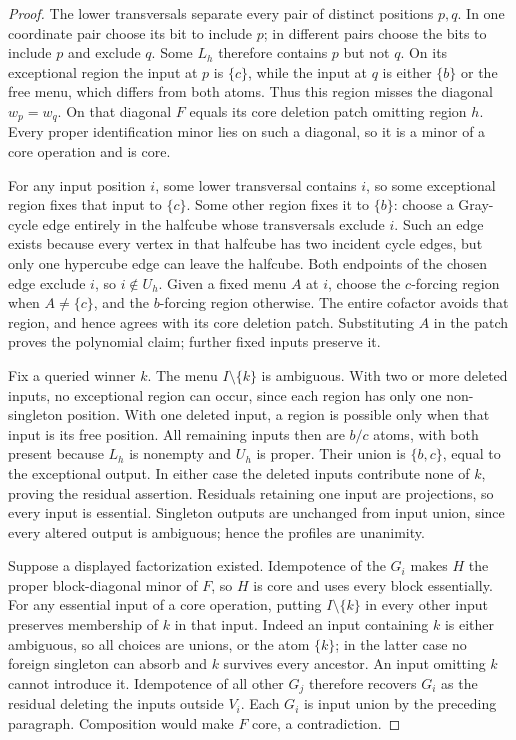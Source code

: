 \begin{proof}
The lower transversals separate every pair of distinct positions $p,q$.
In one coordinate pair choose its bit to include $p$; in different pairs
choose the bits to include $p$ and exclude $q$. Some $L_h$ therefore
contains $p$ but not $q$. On its exceptional region the input at $p$ is
$\{c\}$, while the input at $q$ is either $\{b\}$ or the free menu,
which differs from both atoms. Thus this region misses the diagonal
$w_p=w_q$. On that diagonal $F$ equals its core deletion patch omitting
region $h$. Every proper identification minor lies on such a diagonal,
so it is a minor of a core operation and is core.

For any input position $i$, some lower transversal contains $i$, so some
exceptional region fixes that input to $\{c\}$. Some other region fixes
it to $\{b\}$: choose a Gray-cycle edge entirely in the halfcube whose
transversals exclude $i$. Such an edge exists because every vertex in that
halfcube has two incident cycle edges, but only one hypercube edge can
leave the halfcube. Both endpoints of the chosen edge exclude $i$, so
$i\notin U_h$. Given a fixed menu $A$ at $i$, choose the $c$-forcing
region when $A\ne\{c\}$, and the $b$-forcing region otherwise.
The entire cofactor avoids that region, and hence agrees with its core
deletion patch. Substituting $A$ in the patch proves the polynomial claim;
further fixed inputs preserve it.

Fix a queried winner $k$. The menu $I\setminus\{k\}$ is ambiguous. With
two or more deleted inputs, no exceptional region can occur, since each
region has only one non-singleton position. With one deleted input, a
region is possible only when that input is its free position. All remaining
inputs then are $b/c$ atoms, with both present because $L_h$ is nonempty
and $U_h$ is proper. Their union is $\{b,c\}$, equal to the exceptional
output. In either case the deleted inputs contribute none of $k$, proving
the residual assertion. Residuals retaining one input are projections,
so every input is essential. Singleton outputs are unchanged from input
union, since every altered output is ambiguous; hence the profiles are
unanimity.

Suppose a displayed factorization existed. Idempotence of the $G_i$
makes $H$ the proper block-diagonal minor of $F$, so $H$ is core and
uses every block essentially. For any essential input of a core operation,
putting $I\setminus\{k\}$ in every other input preserves membership of
$k$ in that input. Indeed an input containing $k$ is either ambiguous,
so all choices are unions, or the atom $\{k\}$; in the latter case no
foreign singleton can absorb and $k$ survives every ancestor. An input
omitting $k$ cannot introduce it. Idempotence of all other $G_j$ therefore
recovers $G_i$ as the residual deleting the inputs outside $V_i$.
Each $G_i$ is input union by the preceding paragraph. Composition would
make $F$ core, a contradiction.


\end{proof}

